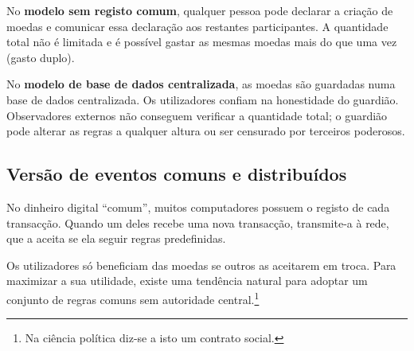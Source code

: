 
No \textbf{modelo sem registo comum}, qualquer pessoa pode declarar a criação
de moedas e comunicar essa declaração aos restantes participantes. A
quantidade total não é limitada e é possível gastar as mesmas moedas mais do
que uma vez (gasto duplo).


No \textbf{modelo de base de dados centralizada}, as moedas são guardadas numa base de dados
centralizada. Os utilizadores confiam na honestidade do guardião. Observadores
externos não conseguem verificar a quantidade total; o guardião pode alterar
as regras a qualquer altura ou ser censurado por terceiros poderosos.
  


\subsection{Versão de eventos comuns e distribuídos}
\label{subsec:shared-version-events}

No dinheiro digital ``comum'', muitos computadores possuem o registo de cada
transacção. Quando um deles recebe uma nova transacção, transmite-a à rede, que
a aceita se ela seguir regras predefinidas.


Os utilizadores só beneficiam das moedas se outros as aceitarem em troca. Para
maximizar a sua utilidade, existe uma tendência natural para adoptar um
conjunto de regras comuns sem autoridade central.\footnote{Na ciência política
diz-se a isto um contrato social.}

